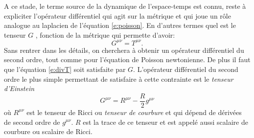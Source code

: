 A ce stade, le terme source de la dynamique de l'espace-temps est connu, reste à expliciter l'opérateur différentiel qui agit sur la métrique et qui joue un rôle analogue au laplacien de l'équation \ref{e:poisson}. En d'autres termes quel est le tenseur $G$ , fonction de la métrique qui permette d'avoir:
\begin{equation}
G^{\mu\nu}=T^{\mu\nu}.
\end{equation}
Sans rentrer dans les détails, on cherchera à obtenir un opérateur différentiel du second ordre, tout comme pour l'équation de Poisson newtonienne. De plus il faut que l'équation \ref{e:divT} soit satisfaite par $G$. L'opérateur différentiel du second ordre le plus simple permettant de satisfaire à cette contrainte est le \textit{tenseur d'Einstein}
\begin{equation}
G^{\mu\nu}=R^{\mu\nu}-\frac{R}{2}g^{\mu\nu}
\label{e:einstein}
\end{equation}
où $R^{\mu\nu}$ est le tenseur de Ricci ou \textit{tenseur de courbure} et qui dépend de dérivées de second ordre de $g^{\mu\nu}$. $R$ est la trace de ce tenseur et est appelé aussi scalaire de courbure ou scalaire de Ricci.

